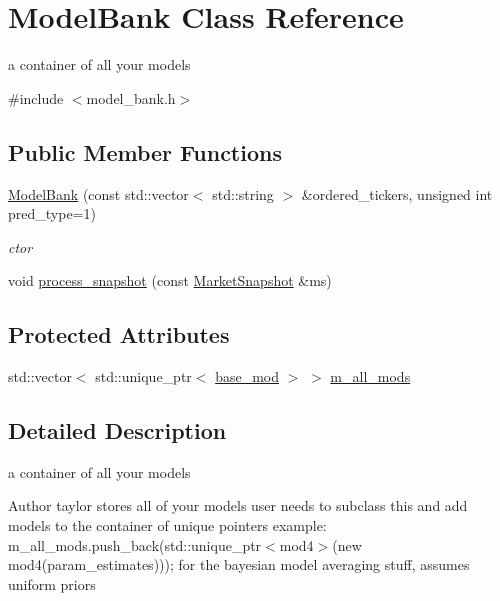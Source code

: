 \hypertarget{classModelBank}{}\section{Model\+Bank Class Reference}
\label{classModelBank}


a container of all your models  




{\ttfamily \#include $<$model\+\_\+bank.\+h$>$}

\subsection*{Public Member Functions}
\begin{DoxyCompactItemize}
\item 
\hyperlink{classModelBank_a781d168f7261cf3247cf1e201c181e09}{Model\+Bank} (const std\+::vector$<$ std\+::string $>$ \&ordered\+\_\+tickers, unsigned int pred\+\_\+type=1)
\begin{DoxyCompactList}\small\item\em ctor \end{DoxyCompactList}\item 
void \hyperlink{classModelBank_a504a7a18eab5bfc72f6760136713a70d}{process\+\_\+snapshot} (const \hyperlink{classMarketSnapshot}{Market\+Snapshot} \&ms)
\end{DoxyCompactItemize}
\subsection*{Protected Attributes}
\begin{DoxyCompactItemize}
\item 
std\+::vector$<$ std\+::unique\+\_\+ptr$<$ \hyperlink{classbase__mod}{base\+\_\+mod} $>$ $>$ \hyperlink{classModelBank_afc89ca7d54b80aed8bc12fec3e584bf0}{m\+\_\+all\+\_\+mods}
\end{DoxyCompactItemize}


\subsection{Detailed Description}
a container of all your models 

\begin{DoxyAuthor}{Author}
taylor stores all of your models user needs to subclass this and add models to the container of unique pointers example\+: m\+\_\+all\+\_\+mods.\+push\+\_\+back(std\+::unique\+\_\+ptr$<$mod4$>$(new mod4(param\+\_\+estimates))); for the bayesian model averaging stuff, assumes uniform priors 
\end{DoxyAuthor}


